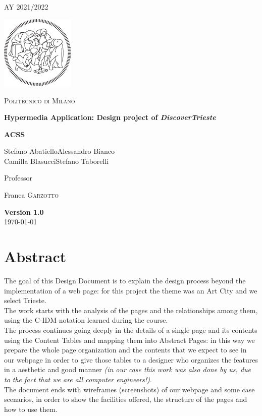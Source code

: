 \documentclass[table, 12pt]{article}
\begin{document}
\begin{titlepage}
    \centering
    {\scshape\large AY 2021/2022 \par}
    \vfill
    \includegraphics[width=100pt]{assets/logo-polimi}\par\vspace{1cm}
    {\scshape\LARGE Politecnico di Milano \par}
    \vspace{1.5cm}
    {\huge\bfseries Hypermedia Application\@: Design project of \textit{DiscoverTrieste} \par}
    \vspace{2cm}
    {\Large \textbf{ACSS}\par}
    {\Large {Stefano Abatiello\quad Alessandro Bianco\\
    Camilla Blasucci\quad Stefano Taborelli}\par}
    \vfill
    {\large Professor\par
        Franca \textsc{Garzotto}}
    \vfill
    {\large \textbf{Version 1.0} \\ \today \par}
\end{titlepage}
\thispagestyle{plain}
\mbox{}
\newpage
{}
\tableofcontents
\newpage
{}

\section{Abstract}
The goal of this Design Document is to explain the design process beyond the implementation of a web page: for this project the theme was an Art City and we select Trieste. \\
The work starts with the analysis of the pages and the relationships among them, using the C-IDM notation learned during the course.\\
The process continues going deeply in the details of a single page and its contents using the Content Tables and mapping them into Abstract Pages: in this way we prepare the whole page organization and the contents that we expect to see in our webpage in order to give those tables to a designer who organizes the features in a aesthetic and good manner \textit{(in our case this work was also done by us, due to the fact that we are all computer engineers!)}.\\
The document ends with wireframes (screenshots) of our webpage and some case scenarios, in order to show the facilities offered, the structure of the pages and how to use them.
\newpage
\end{document}
